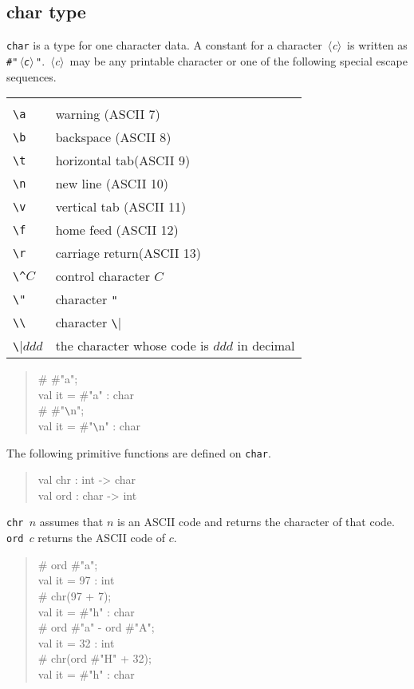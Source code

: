 \documentclass{jbook}
\newcommand{\nonterm}[1]{\mbox{$\,\langle$}{\it #1}\mbox{$\rangle\,$}}
\newenvironment{program}{\begin{quote}\begin{tt}}%
                        {\end{tt}\end{quote}}
\begin{document}
\subsection{char type}
	{\tt char} is a type for one character data.
	A constant for a character \nonterm{c} is written as {\tt \#"\nonterm{c}"}.
	\nonterm{c} may be any printable character or one of the
following special escape sequences.
\begin{center}
\begin{tabular}{|l|l|}
\hline\\
\verb|\a| & {warning (ASCII 7)}\\
\verb|\b| & {backspace (ASCII 8)}\\
\verb|\t| & {horizontal tab(ASCII 9)}\\
\verb|\n| & {new line (ASCII 10)}\\
\verb|\v| & {vertical tab (ASCII 11)}\\
\verb|\f| & {home feed (ASCII 12)}\\
\verb|\r| & {carriage return(ASCII 13)}\\
\verb|\^|$C$ & {control character $C$}\\
\verb|\"| & {character {\tt \verb|"|}}\\ %
\verb|\\| & {character \verb|\|}\\
\verb|\|$ddd$ &  {the character whose code is $ddd$ in decimal}
\\\hline
\end{tabular}
\end{center}
\begin{program}
\# \#"a";\\
val it = \#"a" : char\\
\# \#"\verb|\|n";\\
val it = \#"\verb|\|n" : char
\end{program}
	The following primitive functions are defined on {\tt char}.
\begin{program}
val chr : int -> char\\
val ord : char -> int
\end{program}
	{\tt chr $n$} assumes that $n$ is an ASCII code and returns the
character of that code.
	{\tt ord $c$} returns the ASCII code of $c$.
\begin{program}
\# ord \#"a";\\
val it = 97 : int\\
\# chr(97 + 7);\\
val it = \#"h" : char\\
\# ord \#"a" - ord \#"A";\\
val it = 32 : int\\
\# chr(ord \#"H" + 32);\\
val it = \#"h" : char
\end{program}
\end{document}
